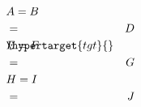 \documentclass{article}
\begin{document}
\begin{eqnarray}
\lefteqn{A = B}&\index{idxone}&\nonumber\\
&=& D\\
\lefteqn{E = F}&\hypertarget{tgt}{}&\nonumber\\
&=& G\\
\lefteqn{H = I}&\phantom{=}&\nonumber\\
&=& J
\end{eqnarray}
\end{document}
